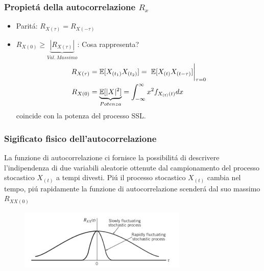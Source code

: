         \subsubsection{Propietá della autocorrelazione $R_x$}
            \begin{itemize}
                \item {Paritá: $R_{X(\tau)} = R_{X(-\tau)}$}
                \item {$R_{X(0)}\geq \underset{Val.\ Massimo}{\underbrace{\left|R_{X(\tau)}\right|}}$: Cosa rappresenta?
                    \begin{align}
                        R_{X(\tau)} &= \mathbb{E}[X_{(t_1)}X_{(t_2)}]=\eval*{\mathbb{E}[X_{(t)}X_{(t-\tau)}] }_{\tau = 0} \nonumber \\
                        R_{X(0)}    &= \underset{Potenza}{\underbrace{\mathbb{E}[|X|^2]}} = \int_{-\infty}^{\infty} x^2f_{X_{(t)}(t)}dx \nonumber
                    \end{align}
                    coincide con la potenza del processo SSL.
                }
            \end{itemize}
        \subsubsection{Sigificato fisico dell'autocorrelazione}
            La funzione di autocorrelazione ci fornisce la possibilitá di descrivere l'indipendenza di due variabili aleatorie ottenute dal campionamento
            del processo stocastico $X_{(t)}$ a tempi divesti. Piú il processo stocastico $X_{(t)}$ cambia nel tempo, piú rapidamente la funzione di autocorrelazione 
            scenderá dal suo massimo $R_{XX(0)}$
            \begin{figure}[H]
                \centering
                \includegraphics[width = 8cm]{media/autocorrelazione stocastica.png}
            \end{figure}
